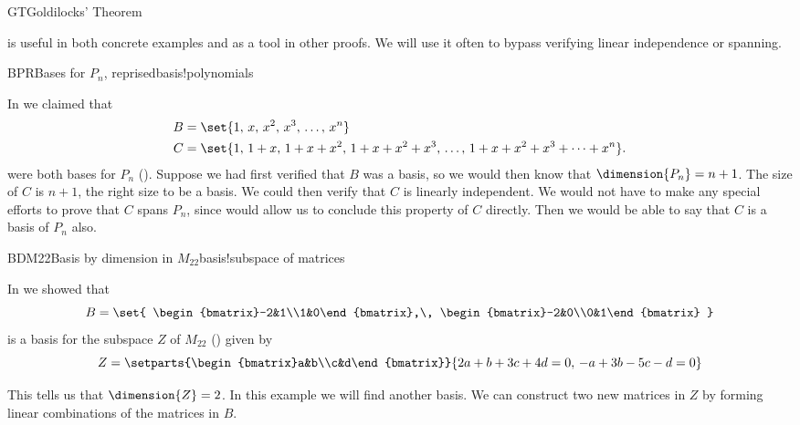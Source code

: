 \begin{subsect}{GT}{Goldilocks' Theorem}
%
\begin{para} is useful in both concrete examples and as a tool in other proofs.  We will use it often to bypass verifying linear independence or spanning.\end{para}
%
\begin{example}{BPR}{Bases for $P_n$, reprised}{basis!polynomials}
%
\begin{para}In  we claimed that
\begin{align*}
B&=\set{1,\,x,\,x^2,\,x^3,\,\ldots,\,x^n}\\
C&=\set{1,\,1+x,\,1+x+x^2,\,1+x+x^2+x^3,\,\ldots,\,1+x+x^2+x^3+\cdots+x^n}.
\end{align*}
%
were both bases for $P_n$ ().  Suppose we had first verified that $B$ was a basis, so we would then know that $\dimension{P_n}=n+1$.  The size of $C$ is $n+1$, the right size to be a basis.  We could then verify that $C$ is linearly independent.  We would not have to make any special efforts to prove that $C$ spans $P_n$, since  would allow us to conclude this property of $C$ directly.  Then we would be able to say that $C$ is a basis of $P_n$ also.\end{para}
%
\end{example}
%
%
\begin{example}{BDM22}{Basis by dimension in $M_{22}$}{basis!subspace of matrices}
\begin{para}In  we showed that
%
\begin{equation*}
B=
\set{
\begin{bmatrix}-2&1\\1&0\end{bmatrix},\,
\begin{bmatrix}-2&0\\0&1\end{bmatrix}
}
\end{equation*}
%
is a basis for the subspace $Z$ of $M_{22}$ () given by
%
\begin{equation*}
Z=\setparts{\begin{bmatrix}a&b\\c&d\end{bmatrix}}{2a+b+3c+4d=0,\,-a+3b-5c-d=0}
\end{equation*}
\end{para}
%
\begin{para}This tells us that $\dimension{Z}=2$.  In this example we will find another basis.  We can construct two new matrices in $Z$ by forming linear combinations of the matrices in $B$.

\end{para}
\end{example}
\end{subsect}

